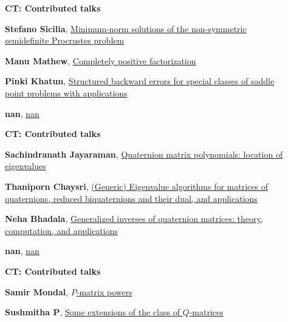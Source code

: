 \documentclass[ILAS2025-program.tex]{subfiles}
\begin{document}
\begin{description}
    \begin{description}
    \item[] {\color{mstitle}\textbf{CT: Contributed talks}} 
    \item[] \hypertarget{up0096}{}\textbf{Stefano Sicilia}, \hyperlink{down0096}{Minimum-norm solutions of the non-symmetric semidefinite Procrustes problem}
        \item[] \hypertarget{up0097}{}\textbf{Manu Mathew}, \hyperlink{down0097}{Completely positive factorization}
        \item[] \hypertarget{up0098}{}\textbf{Pinki Khatun}, \hyperlink{down0098}{Structured backward errors for special classes of saddle point problems with applications}
        \item[] \hypertarget{up0099}{}\textbf{nan}, \hyperlink{down0099}{nan}
        \end{description}
    \begin{description}
    \item[] {\color{mstitle}\textbf{CT: Contributed talks}} 
    \item[] \hypertarget{up0100}{}\textbf{Sachindranath Jayaraman}, \hyperlink{down0100}{Quaternion matrix polynomials: location of eigenvalues}
        \item[] \hypertarget{up0101}{}\textbf{Thaniporn Chaysri}, \hyperlink{down0101}{(Generic) Eigenvalue algorithms for matrices of quaternions, reduced biquaternions and their dual, and applications}
        \item[] \hypertarget{up0102}{}\textbf{Neha Bhadala}, \hyperlink{down0102}{Generalized inverses of quaternion matrices: theory, computation, and applications}
        \item[] \hypertarget{up0103}{}\textbf{nan}, \hyperlink{down0103}{nan}
        \end{description}
    \begin{description}
    \item[] {\color{mstitle}\textbf{CT: Contributed talks}} 
    \item[] \hypertarget{up0104}{}\textbf{Samir Mondal}, \hyperlink{down0104}{$P$-matrix powers}
        \item[] \hypertarget{up0105}{}\textbf{Sushmitha P}, \hyperlink{down0105}{Some extensions of the class of $Q$-matrices}

\end{description}
\end{description}
\end{document}
